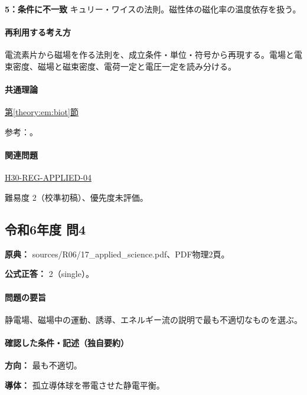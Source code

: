 \noindent\textbf{5：条件に不一致} キュリー・ワイスの法則。磁性体の磁化率の温度依存を扱う。\par

\paragraph{再利用する考え方} 電流素片から磁場を作る法則を、成立条件・単位・符号から再現する。電場と電束密度、磁場と磁束密度、電荷一定と電圧一定を読み分ける。

\paragraph{共通理論} \hyperref[theory:em:biot]{第\ref*{theory:em:biot}節}

\par 参考：\cite{mit_em09}。

\paragraph{関連問題} \hyperref[q:h30-reg-applied-04]{H30-REG-APPLIED-04}

\par 難易度 2（校準初稿）、優先度未評価。

\subsection{令和6年度 問4}
\label{q:r06-reg-applied-04}

\noindent\textbf{原典：} sources/R06/17\_applied\_science.pdf、PDF物理2頁。

\textbf{公式正答：} 2（single）。

\paragraph{問題の要旨} 静電場、磁場中の運動、誘導、エネルギー流の説明で最も不適切なものを選ぶ。

\paragraph{確認した条件・記述（独自要約）}\mbox{}\par

\noindent\textbf{方向：} 最も不適切。\par

\noindent\textbf{導体：} 孤立導体球を帯電させた静電平衡。\par

